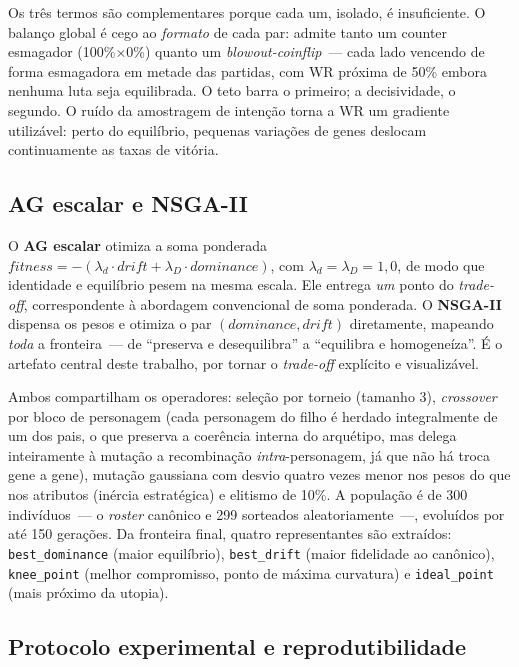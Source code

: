 \documentclass[12pt]{article}
\begin{document}
Os três termos são complementares porque cada um, isolado, é insuficiente. O
balanço global é cego ao \emph{formato} de cada par: admite tanto um counter
esmagador (100\%$\times$0\%) quanto um \emph{blowout-coinflip}~--- cada lado
vencendo de forma esmagadora em metade das partidas, com WR próxima de 50\% embora
nenhuma luta seja equilibrada. O teto barra o primeiro; a decisividade, o segundo.
O ruído da amostragem de intenção torna a WR um gradiente utilizável: perto do
equilíbrio, pequenas variações de genes deslocam continuamente as taxas de vitória.

\subsection{AG escalar e NSGA-II}

O \textbf{AG escalar} otimiza a soma ponderada
$\textit{fitness} = -(\lambda_{d}\cdot\textit{drift} +
\lambda_{D}\cdot\textit{dominance})$, com $\lambda_{d}=\lambda_{D}=1{,}0$, de modo
que identidade e equilíbrio pesem na mesma escala. Ele entrega \emph{um} ponto do
\emph{trade-off}, correspondente à abordagem convencional de soma ponderada. O
\textbf{NSGA-II} \cite{deb2002nsga} dispensa os pesos e otimiza o par
$(\textit{dominance}, \textit{drift})$ diretamente, mapeando \emph{toda} a
fronteira~--- de ``preserva e desequilibra'' a ``equilibra e homogeneíza''. É o
artefato central deste trabalho, por tornar o \emph{trade-off} explícito e
visualizável.

Ambos compartilham os operadores: seleção por torneio (tamanho 3),
\emph{crossover} por bloco de personagem (cada personagem do filho é herdado
integralmente de um dos pais, o que preserva a coerência interna do arquétipo, mas
delega inteiramente à mutação a recombinação \emph{intra}-personagem, já que não há
troca gene a gene), mutação gaussiana com desvio quatro vezes menor nos pesos do
que nos atributos (inércia estratégica) e elitismo de 10\%. A população é de 300
indivíduos~--- o \emph{roster} canônico e 299 sorteados aleatoriamente~---,
evoluídos por até 150 gerações. Da fronteira final, quatro representantes são
extraídos: \texttt{best\_dominance} (maior equilíbrio), \texttt{best\_drift}
(maior fidelidade ao canônico), \texttt{knee\_point} (melhor compromisso, ponto de
máxima curvatura) e \texttt{ideal\_point} (mais próximo da utopia).

\subsection{Protocolo experimental e reprodutibilidade}
\label{sec:protocolo}
\end{document}
